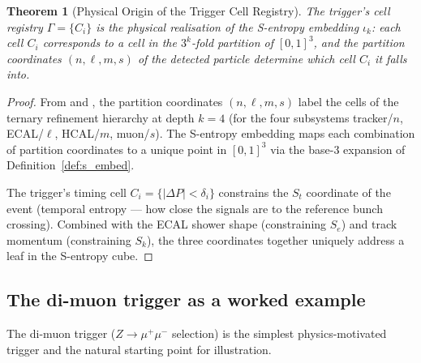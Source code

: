 \documentclass[twocolumn,10pt,a4paper]{article}
\theoremstyle{thmstyle}
\newtheorem{theorem}{Theorem}[section]
\theoremstyle{definition}
\theoremstyle{remark}
\newcommand{\Sk}{S_{k}}
\newcommand{\St}{S_{t}}
\newcommand{\Se}{S_{e}}
\begin{document}
\begin{theorem}[Physical Origin of the Trigger Cell Registry]
\label{thm:cell_registry}
The trigger's cell registry $\Gamma = \{C_i\}$ is the physical realisation
of the S-entropy embedding $\iota_k$: each cell $C_i$ corresponds to a
cell in the $3^k$-fold partition of $[0,1]^3$, and the partition coordinates
$(n,\ell,m,s)$ of the detected particle determine which cell $C_i$ it
falls into.
\end{theorem}

\begin{proof}
From \citet{companion:math} and \citet{companion:planck}, the partition
coordinates $(n,\ell,m,s)$ label the cells of the ternary refinement
hierarchy at depth $k = 4$ (for the four subsystems tracker/$n$, ECAL/$\ell$,
HCAL/$m$, muon/$s$). The S-entropy embedding maps each combination of
partition coordinates to a unique point in $[0,1]^3$ via the base-3
expansion of Definition~\ref{def:s_embed}.

The trigger's timing cell $C_i = \{|\Delta P| < \delta_i\}$ constrains
the $\St$ coordinate of the event (temporal entropy — how close the signals
are to the reference bunch crossing). Combined with the ECAL shower shape
(constraining $\Se$) and track momentum (constraining $\Sk$), the three
coordinates together uniquely address a leaf in the S-entropy cube.
\end{proof}

\subsection{The di-muon trigger as a worked example}

The di-muon trigger ($Z \to \mu^+\mu^-$ selection) is the simplest
physics-motivated trigger and the natural starting point for illustration.
\end{document}
